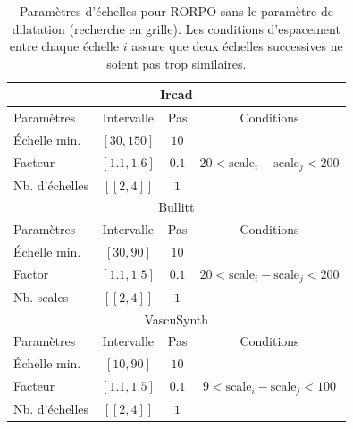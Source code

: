 \begin{table}[H]
  \caption{ Paramètres d'échelles pour RORPO sans le paramètre de dilatation (recherche en grille). Les conditions d'espacement entre chaque échelle $i$ assure que deux échelles successives ne soient pas trop similaires.}
  \label{tab:SS_interval_RORPO}
  \begin{center}
    \begin{tabular}{  l  c  c  c }
      \hline
      \multicolumn{4}{c}{Ircad}\\
      \hline
      Paramètres & Intervalle & Pas & Conditions \\
      \hline
      Échelle min. & $[30,150]$ & $10$ & \\
      Facteur & $[1.1,1.6]$ & $0.1$ & $20 < \textrm{scale}_{i} - \textrm{scale}_{j} < 200$ \\ 
      Nb. d'échelles & $[\![2,4]\!]$ & $1$ & \\
      \hline
      \hline
      \multicolumn{4}{c}{Bullitt}\\
      \hline
      Paramètres & Intervalle & Pas & Conditions \\
      \hline
      Échelle min. & $[30,90]$ & $10$ & \\
      
      Factor & $[1.1,1.5]$  & $0.1$ & $ 20 < \textrm{scale}_{i} - \textrm{scale}_{j} < 200$ \\
      Nb. scales & $[\![2,4]\!]$ & $1$ & \\
      \hline
      \hline
      \multicolumn{4}{c}{VascuSynth}\\
      \hline
      Paramètres & Intervalle & Pas & Conditions \\
      \hline
      Échelle min. & $[10,90]$ & $10$ & \\
      
      Facteur & $[1.1,1.5]$  &  $0.1$ & $ 9 < \textrm{scale}_{i} - \textrm{scale}_{j} < 100$ \\
      
      Nb. d'échelles & $[\![2,4]\!]$ & $1$ & \\
      \hline
    \end{tabular}
  \end{center}
\end{table}

